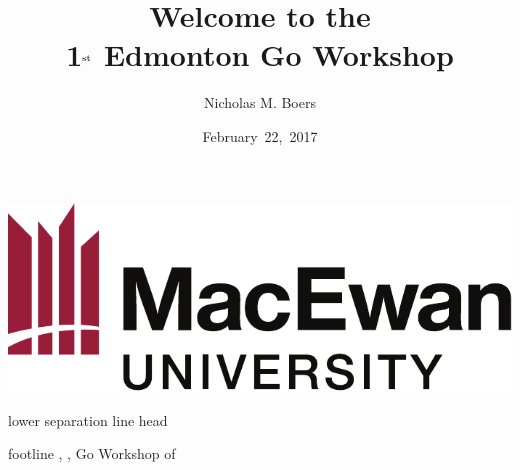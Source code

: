 \title[Welcome]{Welcome to the\\[0.25em]
  1$^{\tiny{}\rm{st}}$ Edmonton Go Workshop}
\author[N. M. Boers]{Nicholas M. Boers}
\date{February~22,~2017}
\def\inserteventshort{Go Workshop}
\def\insertevent{Go Workshop}

\newlength{\logowidth}
\setlength{\logowidth}{1.7cm}
\newlength{\navwidth}
\setlength{\navwidth}{\paperwidth}
\addtolength{\navwidth}{-\logowidth}
\addtolength{\navwidth}{-3pt}
\addtolength{\logowidth}{-3pt}
{%
  \vskip2pt\nobreak%
  \begin{minipage}{\navwidth}%
    \fontsize{8pt}{9.2}\selectfont{}%
    \insertnavigation{\navwidth}%
  \end{minipage}%
  \nobreak\nobreak%
  \begin{minipage}{\logowidth}%
    \vskip2pt%
    \includegraphics[width=\logowidth]{macewan}%
  \end{minipage}%
  \linebreak[0]\vskip4pt%
  \begin{beamercolorbox}[colsep=1.5pt]{lower separation line head}
  \end{beamercolorbox}
}

{%
  \leavevmode%
  \begin{beamercolorbox}{footline}%
    \vskip2pt\hspace{2mm}%
    \insertshorttitle, \insertshortauthor, \insertevent%
    \hfill%
    \insertframenumber\/ of \inserttotalframenumber%
    \kern2mm\vskip2pt%
  \end{beamercolorbox}%
}

